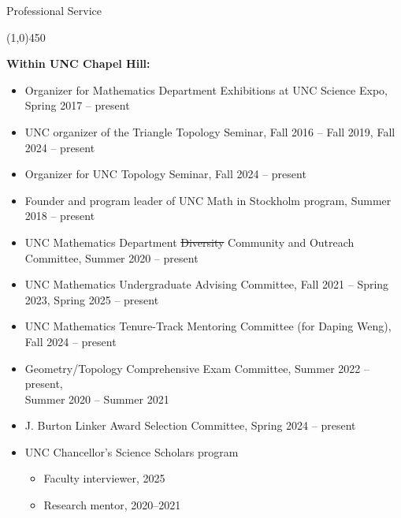 \documentclass[10pt]{article}
\begin{document}





\bigskip
\noindent
{\large \sc Professional Service}

\vspace{-0.1in}
\noindent
\line(1,0){450}
\smallskip

\noindent\textbf{Within UNC Chapel Hill:}

\begin{itemize}

\item Organizer for Mathematics Department Exhibitions at UNC Science Expo, Spring 2017 -- present

\item UNC organizer of the Triangle Topology Seminar, Fall 2016 -- Fall 2019, Fall 2024 -- present

\item Organizer for UNC Topology Seminar, Fall 2024 -- present

\item Founder and program leader of UNC Math in Stockholm program, Summer 2018 -- present

\item UNC Mathematics Department \sout{Diversity} Community and Outreach Committee, Summer 2020 -- present

\item UNC Mathematics Undergraduate Advising Committee, Fall 2021 -- Spring 2023, Spring 2025 -- present

\item UNC Mathematics Tenure-Track Mentoring Committee (for Daping Weng), 
Fall 2024 -- present

\item Geometry/Topology Comprehensive Exam Committee, 
Summer 2022 -- present, \\
Summer 2020 -- Summer 2021

\item J. Burton Linker Award Selection Committee, Spring 2024 -- present

\item UNC Chancellor's Science Scholars program
\begin{itemize}
\item Faculty interviewer, 2025
\item Research mentor, 2020--2021
\end{itemize}


\end{itemize}
\end{document}
